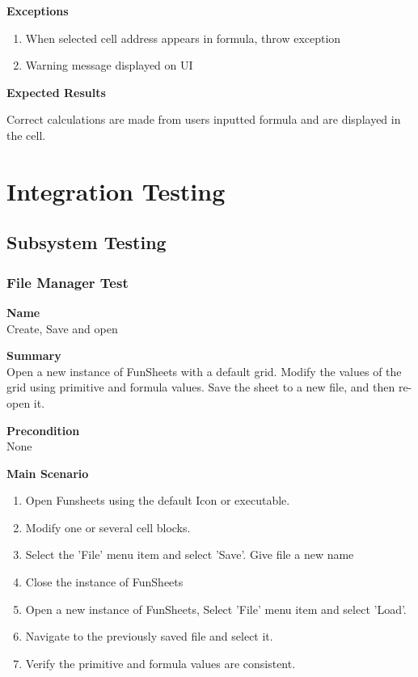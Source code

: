 \documentclass[12pt]{article}
\begin{document}
\noindent
{\bf Exceptions}
\begin{enumerate}
	\item When selected cell address appears in formula, throw exception 
	\item Warning message displayed on UI
\end{enumerate}

\noindent
{\bf Expected Results}

Correct calculations are made from users inputted formula and are displayed in the cell. 

\section{Integration Testing}
\subsection{Subsystem Testing}

\subsubsection{File Manager Test} \label{uc:1}

\noindent
{\bf Name}\\
Create, Save and open

\noindent
{\bf Summary}\\
Open a new instance of FunSheets with a default grid. Modify the values of the grid using primitive and formula values.
Save the sheet to a new file, and then re-open it.

\noindent
{\bf Precondition}\\
None

\noindent
{\bf Main Scenario}\
\vspace*{-0.2in}
\begin{enumerate}
\item Open Funsheets using the default Icon or executable.
\item Modify one or several cell blocks.
\item Select the 'File' menu item and select 'Save'. Give file a new name
\item Close the instance of FunSheets
\item Open a new instance of FunSheets, Select 'File' menu item and select 'Load'.
\item Navigate to the previously saved file and select it.
\item Verify the primitive and formula values are consistent.
\end{enumerate}
\end{document}
